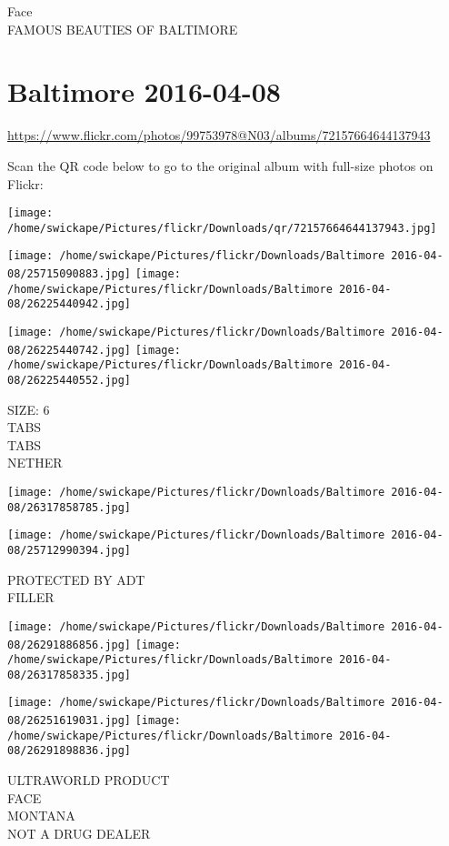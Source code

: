 \documentclass[10pt,letterpaper]{article}
\begin{document}
Face\\
FAMOUS BEAUTIES OF BALTIMORE
\pagebreak

\section*{Baltimore 2016-04-08}

\url{https://www.flickr.com/photos/99753978@N03/albums/72157664644137943}

Scan the QR code below to go to the original album with full-size photos on Flickr:

\texttt{[image: /home/swickape/Pictures/flickr/Downloads/qr/72157664644137943.jpg]}
\pagebreak

\texttt{[image: /home/swickape/Pictures/flickr/Downloads/Baltimore 2016-04-08/25715090883.jpg]}
\texttt{[image: /home/swickape/Pictures/flickr/Downloads/Baltimore 2016-04-08/26225440942.jpg]}

\texttt{[image: /home/swickape/Pictures/flickr/Downloads/Baltimore 2016-04-08/26225440742.jpg]}
\texttt{[image: /home/swickape/Pictures/flickr/Downloads/Baltimore 2016-04-08/26225440552.jpg]}

SIZE: 6\\
TABS\\
TABS\\
NETHER
\pagebreak

\texttt{[image: /home/swickape/Pictures/flickr/Downloads/Baltimore 2016-04-08/26317858785.jpg]}

\vspace{0.25in}
\texttt{[image: /home/swickape/Pictures/flickr/Downloads/Baltimore 2016-04-08/25712990394.jpg]}

PROTECTED BY ADT\\
FILLER
\pagebreak

\texttt{[image: /home/swickape/Pictures/flickr/Downloads/Baltimore 2016-04-08/26291886856.jpg]}
\texttt{[image: /home/swickape/Pictures/flickr/Downloads/Baltimore 2016-04-08/26317858335.jpg]}

\texttt{[image: /home/swickape/Pictures/flickr/Downloads/Baltimore 2016-04-08/26251619031.jpg]}
\texttt{[image: /home/swickape/Pictures/flickr/Downloads/Baltimore 2016-04-08/26291898836.jpg]}

ULTRAWORLD PRODUCT\\
FACE\\
MONTANA\\
NOT A DRUG DEALER
\pagebreak
\end{document}

